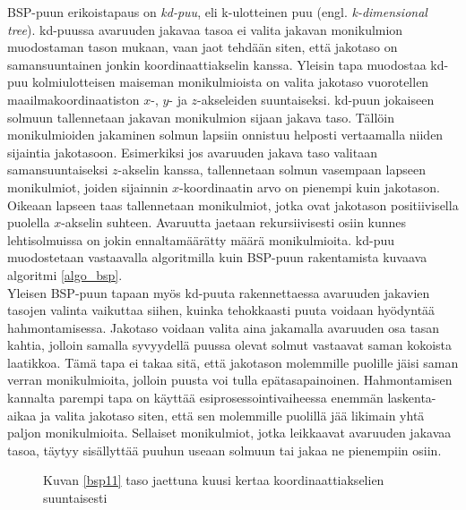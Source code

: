 \documentclass[a4paper, 12pt, titlepage]{article}
\begin{document}
BSP-puun erikoistapaus on \emph{kd-puu}, eli k-ulotteinen puu (engl. \emph{k-dimensional tree}). 
kd-puussa avaruuden jakavaa tasoa ei valita jakavan monikulmion muodostaman tason mukaan, vaan jaot tehdään siten, että jakotaso on samansuuntainen jonkin koordinaattiakselin kanssa. Yleisin tapa muodostaa kd-puu kolmiulotteisen maiseman monikulmioista on valita jakotaso vuorotellen maailmakoordinaatiston $x$-, $y$- ja $z$-akseleiden suuntaiseksi. kd-puun jokaiseen solmuun tallennetaan  
jakavan monikulmion sijaan jakava taso. Tällöin monikulmioiden jakaminen solmun lapsiin onnistuu helposti vertaamalla niiden sijaintia jakotasoon. Esimerkiksi jos avaruuden jakava taso valitaan samansuuntaiseksi $z$-akselin kanssa, tallennetaan solmun vasempaan lapseen monikulmiot, joiden sijainnin $x$-koordinaatin arvo on pienempi kuin jakotason. Oikeaan lapseen taas tallennetaan monikulmiot, jotka ovat jakotason positiivisella puolella $x$-akselin suhteen. \citep[.]{samet} Avaruutta jaetaan rekursiivisesti osiin kunnes lehtisolmuissa on jokin ennaltamäärätty määrä monikulmioita. kd-puu muodostetaan vastaavalla algoritmilla kuin BSP-puun rakentamista kuvaava algoritmi \ref{algo_bsp}.\\

Yleisen BSP-puun tapaan myös kd-puuta rakennettaessa avaruuden jakavien tasojen valinta vaikuttaa siihen, kuinka tehokkaasti puuta voidaan hyödyntää hahmontamisessa. Jakotaso voidaan valita aina jakamalla avaruuden osa tasan kahtia, jolloin samalla syvyydellä puussa olevat solmut vastaavat saman kokoista laatikkoa. Tämä tapa ei takaa sitä, että jakotason molemmille puolille jäisi saman verran monikulmioita, jolloin puusta voi tulla epätasapainoinen. Hahmontamisen kannalta parempi tapa on käyttää esiprosessointivaiheessa enemmän laskenta-aikaa ja valita jakotaso siten, että sen molemmille puolillä jää likimain yhtä paljon monikulmioita. Sellaiset monikulmiot, jotka leikkaavat avaruuden jakavaa tasoa, täytyy sisällyttää puuhun useaan solmuun tai jakaa ne pienempiin osiin. \citep[.]{havran}\\

\begin{figure}
 \centering 
 \def\svgwidth{0.9\linewidth}
 
 \caption{Kuvan \ref{bsp11} taso jaettuna kuusi kertaa koordinaattiakselien suuntaisesti}
 \label{bsp3}
\end{figure}
\end{document}
